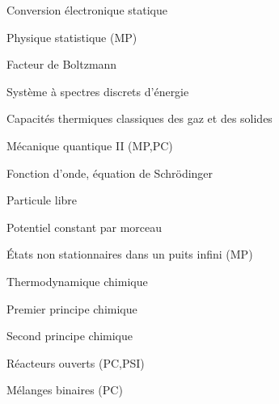 \begin{multicols}{2}
\begin{programme}
\begin{programme}
            \item Conversion électronique statique
        \end{programme}
    \item Physique statistique (MP)
        \begin{programme}
            \item Facteur de Boltzmann
            \item Système à spectres discrets d’énergie
            \item Capacités thermiques classiques des gaz et des solides
        \end{programme}
    \item Mécanique quantique II (MP,PC)
         \begin{programme}
                \item Fonction d’onde, équation de Schrödinger
                \item Particule libre
                \item Potentiel constant par morceau
                \item \'Etats non stationnaires dans un puits infini (MP)
            \end{programme}
    \item Thermodynamique chimique
         \begin{programme}
                \item Premier principe chimique
                \item Second principe chimique
                \item Réacteurs ouverts (PC,PSI)
                \item Mélanges binaires (PC)
            \end{programme}
    

\end{programme}
\end{multicols}
